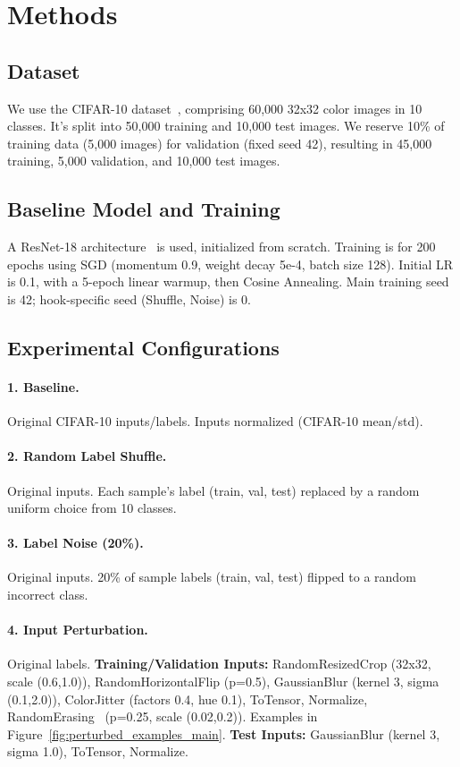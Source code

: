 \documentclass[10pt,twocolumn,letterpaper]{article}
\begin{document}
\section{Methods}
\label{sec:methods}

\subsection{Dataset}
We use the CIFAR-10 dataset~\cite{krizhevsky2009learning}, comprising 60,000 32x32 color images in 10 classes. It's split into 50,000 training and 10,000 test images. We reserve 10\% of training data (5,000 images) for validation (fixed seed 42), resulting in 45,000 training, 5,000 validation, and 10,000 test images.

\subsection{Baseline Model and Training}
A ResNet-18 architecture~\cite{DBLP:conf/cvpr/HeZRS16} is used, initialized from scratch.
Training is for 200 epochs using SGD (momentum 0.9, weight decay 5e-4, batch size 128). Initial LR is 0.1, with a 5-epoch linear warmup, then Cosine Annealing.
Main training seed is 42; hook-specific seed (Shuffle, Noise) is 0.

\subsection{Experimental Configurations}

\paragraph{1. Baseline.}
Original CIFAR-10 inputs/labels. Inputs normalized (CIFAR-10 mean/std).

\paragraph{2. Random Label Shuffle.}
Original inputs. Each sample's label (train, val, test) replaced by a random uniform choice from 10 classes.

\paragraph{3. Label Noise (20\%).}
Original inputs. 20\% of sample labels (train, val, test) flipped to a random incorrect class.

\paragraph{4. Input Perturbation.}
Original labels.
\textbf{Training/Validation Inputs:} RandomResizedCrop (32x32, scale (0.6,1.0)), RandomHorizontalFlip (p=0.5), GaussianBlur (kernel 3, sigma (0.1,2.0)), ColorJitter (factors 0.4, hue 0.1), ToTensor, Normalize, RandomErasing~\cite{DBLP:conf/aaai/Zhong0KL020} (p=0.25, scale (0.02,0.2)). Examples in Figure~\ref{fig:perturbed_examples_main}.
\textbf{Test Inputs:} GaussianBlur (kernel 3, sigma 1.0), ToTensor, Normalize.
\end{document}
